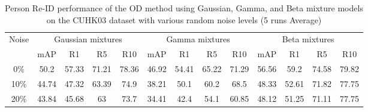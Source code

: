 \documentclass[lettersize,journal]{IEEEtran}
\begin{document}
\begin{table}[!t]
\centering
\caption{Person Re-ID performance of the OD method using Gaussian, Gamma, and Beta mixture models on the CUHK03 dataset with various random noise levels (5 runs Average)}
\begin{tabular}{c|cccc|cccc|cccc}
\hline
\multirow{2}{*}{Noise} & \multicolumn{4}{c|}{Gaussian mixtures} & \multicolumn{4}{c|}{Gamma mixtures} & \multicolumn{4}{c}{Beta mixtures} \\ \cline{2-13} 
 & mAP & R1 & R5 & R10 & mAP & R1 & R5 & R10 & mAP & R1 & R5 & R10 \\ \hline
0\% & 50.2 & 57.33 & 71.21 & 78.36 & 46.92 & 54.41 & 65.22 & 71.29 & 56.56 & 59.2 & 74.58 & 79.82 \\
10\% & 44.74 & 47.32 & 63.39 & 74.9 & 38.21 & 50.1 & 60.2 & 68.5 & 48.33 & 52.61 & 71.82 & 77.75 \\
20\% & 43.84 & 45.68 & 63 & 73.7 & 34.41 & 42.4 & 54.1 & 60.85 & 48.12 & 51.25 & 71.11 & 77.75 \\ \hline
\end{tabular}
\label{tab:BGG_ReId}
\end{table}
\end{document}
